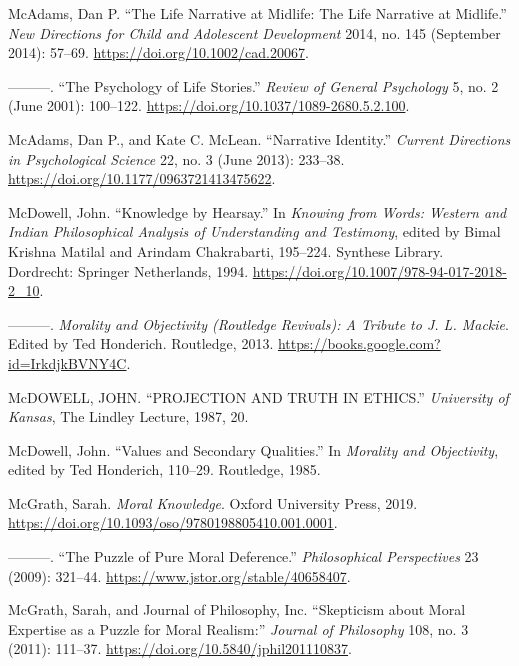 \documentclass[
  12pt,
]{book}
\newlength{\cslhangindent}
\newenvironment{CSLReferences}[2] %
 {\begin{list}{}{%
  \setlength{\itemindent}{0pt}
  \setlength{\leftmargin}{0pt}
  \setlength{\parsep}{0pt}
  \ifodd #1
   \setlength{\leftmargin}{\cslhangindent}
   \setlength{\itemindent}{-1\cslhangindent}
  \fi
  \setlength{\itemsep}{#2\baselineskip}}}
 {\end{list}}
\theoremstyle{definition}
\theoremstyle{definition}
\theoremstyle{definition}
\theoremstyle{definition}
\theoremstyle{remark}
\begin{document}
\begin{CSLReferences}{1}{0}
McAdams, Dan P. {``The {Life Narrative} at {Midlife}: {The Life Narrative} at {Midlife}.''} \emph{New Directions for Child and Adolescent Development} 2014, no. 145 (September 2014): 57--69. \url{https://doi.org/10.1002/cad.20067}.

---------. {``The {Psychology} of {Life Stories}.''} \emph{Review of General Psychology} 5, no. 2 (June 2001): 100--122. \url{https://doi.org/10.1037/1089-2680.5.2.100}.

McAdams, Dan P., and Kate C. McLean. {``Narrative {Identity}.''} \emph{Current Directions in Psychological Science} 22, no. 3 (June 2013): 233--38. \url{https://doi.org/10.1177/0963721413475622}.

McDowell, John. {``Knowledge by {Hearsay}.''} In \emph{Knowing from {Words}: {Western} and {Indian Philosophical Analysis} of {Understanding} and {Testimony}}, edited by Bimal Krishna Matilal and Arindam Chakrabarti, 195--224. Synthese {Library}. Dordrecht: Springer Netherlands, 1994. \url{https://doi.org/10.1007/978-94-017-2018-2_10}.

---------. \emph{Morality and {Objectivity} ({Routledge Revivals}): {A Tribute} to {J}. {L}. {Mackie}}. Edited by Ted Honderich. Routledge, 2013. \url{https://books.google.com?id=IrkdjkBVNY4C}.

McDOWELL, JOHN. {``{PROJECTION AND TRUTH IN ETHICS}.''} \emph{University of Kansas}, The {Lindley Lecture}, 1987, 20.

McDowell, John. {``Values and {Secondary Qualities}.''} In \emph{Morality and {Objectivity}}, edited by Ted Honderich, 110--29. Routledge, 1985.

McGrath, Sarah. \emph{Moral {Knowledge}}. Oxford University Press, 2019. \url{https://doi.org/10.1093/oso/9780198805410.001.0001}.

---------. {``The {Puzzle} of {Pure Moral Deference}.''} \emph{Philosophical Perspectives} 23 (2009): 321--44. \url{https://www.jstor.org/stable/40658407}.

McGrath, Sarah, and Journal of Philosophy, Inc. {``Skepticism about {Moral Expertise} as a {Puzzle} for {Moral Realism}:''} \emph{Journal of Philosophy} 108, no. 3 (2011): 111--37. \url{https://doi.org/10.5840/jphil201110837}.


\end{CSLReferences}
\end{document}
